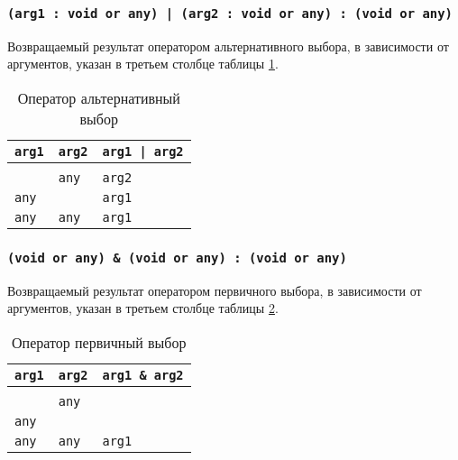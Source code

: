 \subsubsection{\texttt{(arg1 : void or any) | (arg2 : void or any) : (void or any)}}

Возвращаемый результат оператором альтернативного выбора, в зависимости от аргументов, указан в третьем столбце таблицы \ref{orhacktable}.

\begin{table}[htb]
	\caption{Оператор альтернативный выбор}
	\label{orhacktable}
	\begin{tabular}{|l|l|l|}
		\hline
		\texttt{arg1} & \texttt{arg2} & \texttt{arg1 | arg2} \\ \hline
		\void{}     & \void{}     & \void{}  			\\ \hline
		\void{}     & \texttt{any}  & \texttt{arg2}  		\\ \hline
		\texttt{any}  & \void{}     & \texttt{arg1}  		\\ \hline
		\texttt{any}  & \texttt{any}  & \texttt{arg1}  		\\ \hline
	\end{tabular}
	\vspace{0em}
\end{table}

\subsubsection{\texttt{(void or any) & (void or any) : (void or any)}}

Возвращаемый результат оператором первичного выбора, в зависимости от аргументов, указан в третьем столбце таблицы \ref{andhacktable}.

\begin{table}[htb]
	\caption{Оператор первичный выбор}
	\label{andhacktable}
	\begin{tabular}{|l|l|l|}
		\hline
		\texttt{arg1} & \texttt{arg2} & \texttt{arg1 \& arg2} \\ \hline
		\void{}     & \void{}     & \void{}   			\\ \hline
		\void{}     & \texttt{any}  & \void{}   			\\ \hline
		\texttt{any}  & \void{}     & \void{}   			\\ \hline
		\texttt{any}  & \texttt{any}  & \texttt{arg1}   		\\ \hline
	\end{tabular}
	\vspace{0em}
\end{table}

